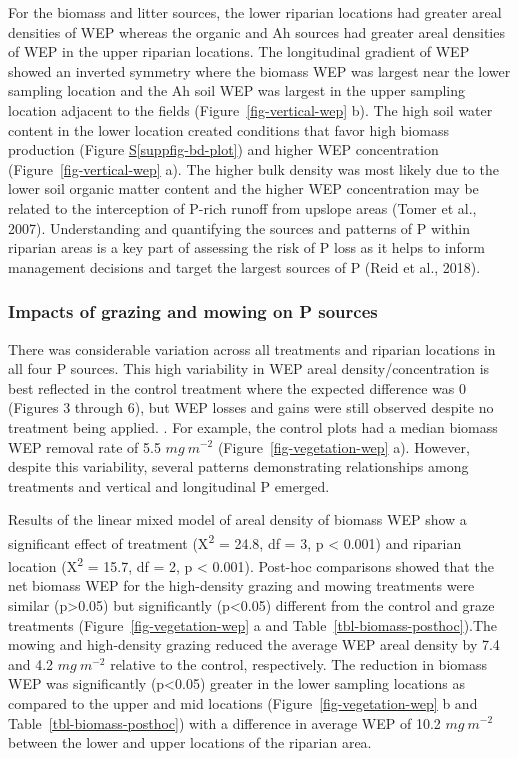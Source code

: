 \documentclass[
]{agujournal2019}
\newcommand*\quartosuppfigref[1]{Figure \hyperref[#1]{S\ref{#1}}}
\begin{document}
For the biomass and litter sources, the lower riparian locations had
greater areal densities of WEP whereas the organic and Ah sources had
greater areal densities of WEP in the upper riparian locations. The
longitudinal gradient of WEP showed an inverted symmetry where the
biomass WEP was largest near the lower sampling location and the Ah soil
WEP was largest in the upper sampling location adjacent to the fields
(Figure~\ref{fig-vertical-wep} b). The high soil water content in the
lower location created conditions that favor high biomass production
(\quartosuppfigref{suppfig-bd-plot}) and higher WEP concentration
(Figure~\ref{fig-vertical-wep} a). The higher bulk density was most
likely due to the lower soil organic matter content and the higher WEP
concentration may be related to the interception of P-rich runoff from
upslope areas (Tomer et al., 2007). Understanding and quantifying the
sources and patterns of P within riparian areas is a key part of
assessing the risk of P loss as it helps to inform management decisions
and target the largest sources of P (Reid et al., 2018).

\subsubsection{Impacts of grazing and mowing on P
sources}\label{impacts-of-grazing-and-mowing-on-p-sources}

There was considerable variation across all treatments and riparian
locations in all four P sources. This high variability in WEP areal
density/concentration is best reflected in the control treatment where
the expected difference was 0 (Figures 3 through 6), but WEP losses and
gains were still observed despite no treatment being applied. . For
example, the control plots had a median biomass WEP removal rate of 5.5
\(mg~m^{-2}\) (Figure~\ref{fig-vegetation-wep} a). However, despite this
variability, several patterns demonstrating relationships among
treatments and vertical and longitudinal P emerged.

Results of the linear mixed model of areal density of biomass WEP show a
significant effect of treatment (X\textsuperscript{2} = 24.8, df = 3, p
\textless{} 0.001) and riparian location (X\textsuperscript{2} = 15.7,
df = 2, p \textless{} 0.001). Post-hoc comparisons showed that the net
biomass WEP for the high-density grazing and mowing treatments were
similar (p\textgreater0.05) but significantly (p\textless0.05) different
from the control and graze treatments (Figure~\ref{fig-vegetation-wep} a
and Table~\ref{tbl-biomass-posthoc}).The mowing and high-density grazing
reduced the average WEP areal density by 7.4 and 4.2 \(mg~m^{-2}\)
relative to the control, respectively. The reduction in biomass WEP was
significantly (p\textless0.05) greater in the lower sampling locations
as compared to the upper and mid locations
(Figure~\ref{fig-vegetation-wep} b and Table~\ref{tbl-biomass-posthoc})
with a difference in average WEP of 10.2 \(mg~m^{-2}\) between the lower
and upper locations of the riparian area.
\end{document}

